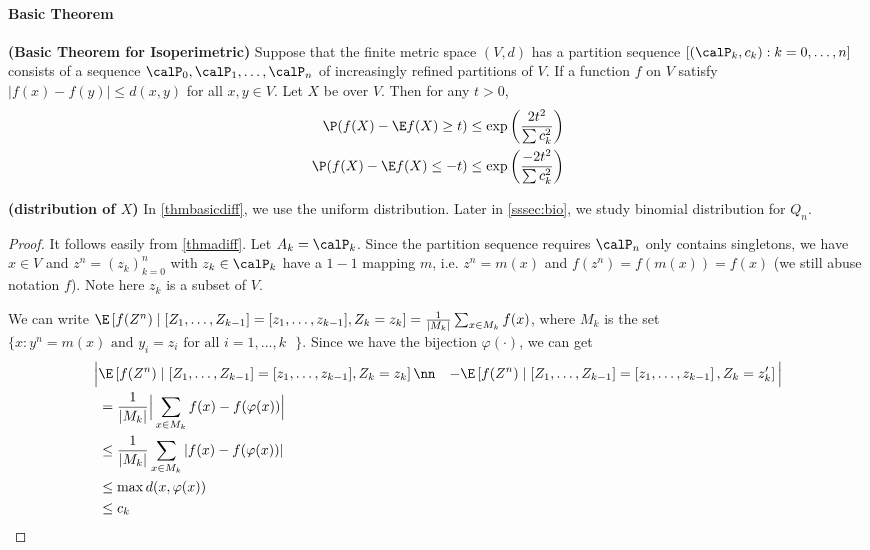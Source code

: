 \documentclass{article}
\newcommand{\bfs}[1]{\textbf{({#1})}}
\begin{document}
\paragraph{Basic Theorem}
\begin{thma}{\bfs{Basic Theorem for Isoperimetric}}\label{thmbasicdiff}
Suppose that the finite metric space $( V , d )$ has a partition sequence $\left[\left( \calP_k , c _{ k }\right): k =0, \ldots, n \right]$ consists of a sequence $\calP_{0}, \calP_{1}, \ldots, \calP_{ n }$ of {increasingly refined partitions} of $V$. If a function $f$ on $V$ satisfy $|f(x)-f(y)|\le d ( x , y )$ for all $x , y \in V$. Let $X$ be  over $V$. Then for any $t >0$,
\begin{align*}
\P ( f ( X )- \E f ( X ) \geq t ) &\leq \exp \left(\frac{2 t ^{2}}{\sum c _{ k }^{2}}\right) \\
\P ( f ( X )- \E f ( X ) \leq- t ) &\leq \exp \left(\frac{-2 t ^{2}}{\sum c _{ k }^{2}}\right)    
\end{align*}
\end{thma}
\begin{rema}{\bfs{distribution of $X$}}
In \cref{thmbasicdiff}, we use the uniform distribution. Later in \cref{sssec:bio}, we study binomial distribution for $Q_n$.
\end{rema}
\begin{proof}
It follows easily from \cref{thmadiff}. Let $A_k=\calP_k$. Since the partition sequence requires $\calP_{ n }$ only contains singletons, we have $x \in V$ and $z^n=(z_k)_{k=0}^{n}$ with $z_k\in \calP_k$ have a $1-1$ mapping $m$, i.e. $z^n=m(x)$ and $f(z^n)=f(m(x))=f(x)$ (we still abuse notation $f$). Note here $z_k$ is a subset of $V$.

We can write $\E \left[ f (Z^n) \mid [Z _{1}, \ldots, Z _{ k -1}]=[z _{1}, \ldots, z_{ k -1}], Z_{ k }= z_{ k }\right] = \frac{1}{|M_{ k }|}\sum_{x\in M_{ k }} f(x)$, where $M_k$ is the set $\{x:y^n = m(x) \text{ and } y_i=z_i \text{ for all $i=1,...,k$ }\}$. Since we have the bijection $\varphi( \cdot )$, we can get  
\begin{align*}
    \Big|&\E \left[ f (Z^n) \mid [Z _{1}, \ldots, Z _{ k -1}]=[z _{1}, \ldots, z_{ k -1}], Z_{ k }= z_{ k }\right] \nn
&- \E \left[ f (Z^n) \mid\left[ Z_{1}, \ldots, Z_{ k -1}\right]=\left[ z_{1}, \ldots, z_{ k -1}\right], Z_{ k }= z_{ k }^{\prime}\right] \Big|\\
& = \frac{1}{|M_{ k }|} \Big|\sum_{x\in M_{ k }} f(x)-f(\varphi(x)) \Big| \\
& \le \frac{1}{|M_{ k }|}\sum_{x\in M_{ k }}|f(x)-f(\varphi(x))|\\
& \le \max d(x,\varphi(x))\\
&\le c_k
\end{align*}
\end{proof}
\end{document}
